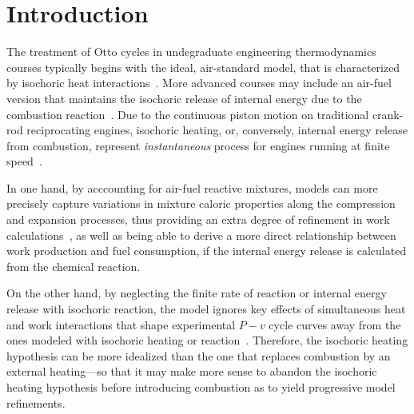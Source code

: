 
\section{Introduction}

    The treatment of Otto cycles in undegraduate  engineering  thermodynamics  courses  typically  begins  with  the  ideal,  air-standard  model,  that  is  characterized  by  isochoric  heat
    interactions~\cite{2014-CengelYA+BolesMA-McGrawHill, 2002-MoranMJ+ShapiroHN-LTC, 1985-WylenG-Wiley, 2015-KroosKA+PotterMC-Cengage}. More advanced courses may include  an  air-fuel  version
    that maintains the isochoric release of internal energy due to the combustion  reaction~\cite{2012-BrunettiF-Blucher}.  Due  to  the  continuous  piston  motion  on  traditional  crank-rod
    reciprocating  engines,  isochoric  heating,  or,  conversely,  internal  energy  release  from  combustion,  represent  \emph{instantaneous}  process  for  engines   running   at   finite
    speed~\cite{2017-NaaktgeborenC-IntJMechEngEduc}.

    In one hand, by acccounting for air-fuel reactive mixtures, models can more precisely capture variations in mixture caloric properties along the compression and expansion  processes,  thus
    providing an extra degree of refinement in work calculations~\cite{2012-BrunettiF-Blucher}, as well as being able to derive a more direct relationship  between  work  production  and  fuel
    consumption, if the internal energy release is calculated from the chemical reaction.

    On the other hand, by neglecting the finite rate of reaction or internal energy release with isochoric reaction, the model ignores key effects of simultaneous heat  and  work  interactions
    that shape experimental $P-v$ cycle curves away from the ones modeled with isochoric heating or reaction~\cite{2013-MartinsJJG-Publindustria}. Therefore, the isochoric  heating  hypothesis
    can be more idealized than the one that replaces combustion by an external heating---so that it may make  more  sense  to  abandon  the  isochoric  heating  hypothesis  before  introducing
    combustion as to yield progressive model refinements.

